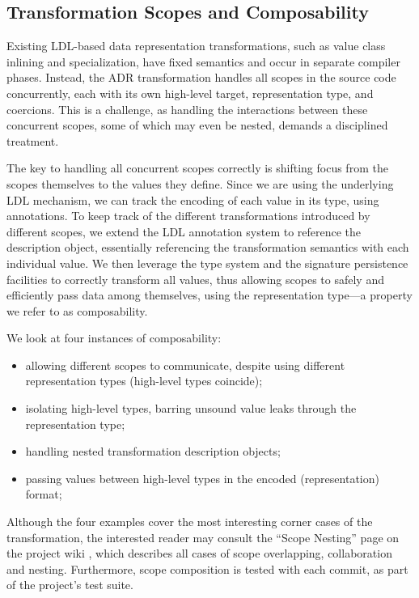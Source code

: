 \subsection{Transformation Scopes and Composability}
\label{sec:ildl:scoped}

Existing LDL-based data representation transformations, such as value class inlining and specialization, have fixed semantics and occur in separate compiler phases. Instead, the ADR transformation handles all scopes in the source code concurrently, each with its own high-level target, representation type, and coercions. This is a challenge, as handling the interactions between these concurrent scopes, some of which may even be nested, demands a disciplined treatment.

The key to handling all concurrent scopes correctly is shifting focus from the scopes themselves to the values they define. Since we are using the underlying LDL mechanism, we can track the encoding of each value in its type, using annotations. To keep track of the different transformations introduced by different scopes, we extend the LDL annotation system to reference the description object, essentially referencing the   transformation semantics with each individual value. We then leverage the type system and the signature persistence facilities to correctly transform all values, thus allowing scopes to safely and efficiently pass data among themselves, using the representation type---a property we refer to as composability.

We look at four instances of composability:


\begin{itemize}
  \item allowing different scopes to communicate, despite using different representation types (high-level types coincide);
  \item isolating high-level types, barring unsound value leaks through the representation type;
  \item handling nested transformation description objects;
  \item passing values between high-level types in the encoded (representation) format;
\end{itemize}


Although the four examples cover the most interesting corner cases of the transformation, the interested reader may consult the ``Scope Nesting'' page on the project wiki \cite{ildl-plugin-wiki}, which describes all cases of scope overlapping, collaboration and nesting. Furthermore, scope composition is tested with each commit, as part of the project's test suite.

